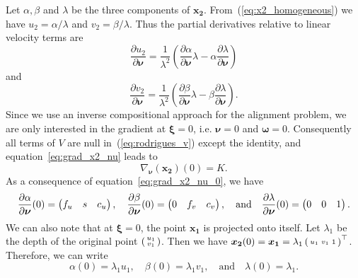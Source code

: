 Let $\alpha, \beta$ and $\lambda$ be the three components of $\bm{x_2}$.
From~(\ref{eq:x2_homogeneous}) we have $u_2 = \alpha / \lambda$ and $v_2 = \beta / \lambda$.
Thus the partial derivatives relative to linear velocity terms are
\begin{equation}
\label{eq:grad_u2_nu}
	\frac{\partial u_2}{\partial \bm{\nu}}
		= \frac{1}{\lambda^2}
			\left( \frac{\partial \alpha}{\partial \bm{\nu}} \lambda
			- \alpha \frac{\partial \lambda}{\partial \bm{\nu}}
			\right)
\end{equation}
and
\begin{equation}
\label{eq:grad_v2_nu}
	\frac{\partial v_2}{\partial \bm{\nu}}
		= \frac{1}{\lambda^2}
			\left( \frac{\partial \beta}{\partial \bm{\nu}} \lambda
			- \beta \frac{\partial \lambda}{\partial \bm{\nu}}
			\right).
\end{equation}
Since we use an inverse compositional approach for the alignment problem,
we are only interested in the gradient at $\bm{\xi}=0$, i.e. $\bm{\nu} = 0$ and $\bm{\omega} = 0$.
Consequently all terms of $V$ are null in~(\ref{eq:rodrigues_v}) except the identity,
and equation~\ref{eq:grad_x2_nu} leads to
\begin{equation}
\label{eq:grad_x2_nu_0}
	\nabla_{\bm{\nu}}(\bm{x_2})(0) = K.
\end{equation}
As a consequence of equation~\ref{eq:grad_x2_nu_0}, we have
\begin{equation}
\label{eq:d_alpha_d_nu}
	\frac{\partial \alpha}{\partial \bm{\nu}}(0)
		= \begin{pmatrix} {f_u} & {s} & {c_u} \end{pmatrix},
	\quad
	\frac{\partial \beta}{\partial \bm{\nu}}(0)
		= \begin{pmatrix} {0} & {f_v} & {c_v} \end{pmatrix},
	\quad \textrm{and} \quad
	\frac{\partial \lambda}{\partial \bm{\nu}}(0)
		= \begin{pmatrix} {0} & {0} & {1} \end{pmatrix}.
\end{equation}
We can also note that at $\bm{\xi} = 0$, the point $\bm{x_1}$ is projected onto itself.
Let $\lambda_1$ be the depth of the original point $\left(\begin{smallmatrix} u_1 \\ v_1 \end{smallmatrix} \right)$.
Then we have $\bm{x_2}(0) = \bm{x_1} = \lambda_1 \left(\begin{smallmatrix}  u_1 & v_1 & 1 \end{smallmatrix} \right)^{\top}$.
Therefore, we can write
\begin{equation}
\label{eq:alpha_0}
	\alpha (0) = \lambda_1 u_1,
	\quad
	\beta (0) = \lambda_1 v_1,
	\quad \textrm{and} \quad
	\lambda (0) = \lambda_1.
\end{equation}

